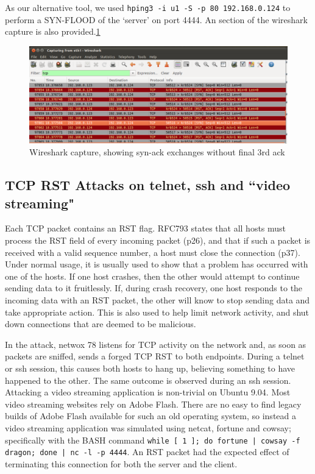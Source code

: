 As our alternative tool, we used {\tt hping3 -i u1 -S -p 80 192.168.0.124} to perform a SYN-FLOOD of the `server' on
port 4444. An section of the wireshark capture is also provided.\ref{fig:ws-rst}

\begin{figure}[h]
    \centering
    \includegraphics[width=.75\linewidth]{images/ws-rst-crop.png}
    \caption{Wireshark capture, showing syn-ack exchanges without final 3rd ack}
    \label{fig:ws-rst}
\end{figure}

\subsection{TCP RST Attacks on telnet, ssh and ``video streaming"}

Each TCP packet contains an RST flag. RFC793 states that all hosts must process the RST field of every incoming packet
(p26), and that if such a packet is received with a valid sequence number, a host must close the connection (p37). Under
normal usage, it is usually used to show that a problem has occurred with one of the hosts. If one host crashes, then
the other would attempt to continue sending data to it fruitlessly. If, during crash recovery, one host responds to the
incoming data with an RST packet, the other will know to stop sending data and take appropriate action. This is also
used to help limit network activity, and shut down connections that are deemed to be malicious.

In the attack, netwox 78 listens for TCP activity on the network and, as soon as packets are sniffed, sends a forged TCP
RST to both endpoints. During a telnet or ssh session, this causes both hosts to hang up, believing something to have
happened to the other. The same outcome is observed during an ssh session. Attacking a video streaming application is
non-trivial on Ubuntu 9.04. Most video streaming websites rely on Adobe Flash. There are no easy to find legacy builds
of Adobe Flash available for such an old operating system, so instead a video streaming application was simulated using
netcat, fortune and cowsay; specifically with the BASH command {\tt while [ 1 ]; do fortune | cowsay -f dragon; done |
nc -l -p 4444}. An RST packet had the expected effect of terminating this connection for both the server and the client.

